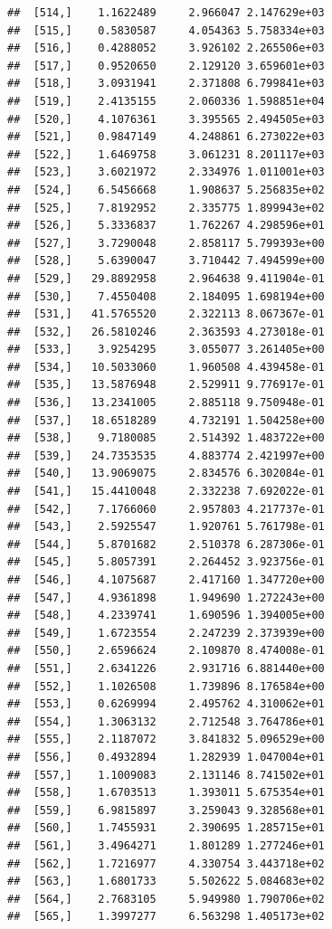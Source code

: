 \documentclass[article]{jss}\usepackage[]{graphicx}\usepackage[]{xcolor}
\makeatletter
\newenvironment{kframe}{%
 \def\at@end@of@kframe{}%
 \ifinner\ifhmode%
  \def\at@end@of@kframe{\end{minipage}}%
  \begin{minipage}{\columnwidth}%
 \fi\fi%
 \def\FrameCommand##1{\hskip\@totalleftmargin \hskip-\fboxsep
 \colorbox{shadecolor}{##1}\hskip-\fboxsep
     \hskip-\linewidth \hskip-\@totalleftmargin \hskip\columnwidth}%
 \MakeFramed {\advance\hsize-\width
   \@totalleftmargin\z@ \linewidth\hsize
   \@setminipage}}%
 {\par\unskip\endMakeFramed%
 \at@end@of@kframe}
\newenvironment{knitrout}{}{} %
\makeatother
\begin{document}
\begin{knitrout}
\begin{kframe}
\begin{verbatim}
##  [514,]    1.1622489     2.966047 2.147629e+03
##  [515,]    0.5830587     4.054363 5.758334e+03
##  [516,]    0.4288052     3.926102 2.265506e+03
##  [517,]    0.9520650     2.129120 3.659601e+03
##  [518,]    3.0931941     2.371808 6.799841e+03
##  [519,]    2.4135155     2.060336 1.598851e+04
##  [520,]    4.1076361     3.395565 2.494505e+03
##  [521,]    0.9847149     4.248861 6.273022e+03
##  [522,]    1.6469758     3.061231 8.201117e+03
##  [523,]    3.6021972     2.334976 1.011001e+03
##  [524,]    6.5456668     1.908637 5.256835e+02
##  [525,]    7.8192952     2.335775 1.899943e+02
##  [526,]    5.3336837     1.762267 4.298596e+01
##  [527,]    3.7290048     2.858117 5.799393e+00
##  [528,]    5.6390047     3.710442 7.494599e+00
##  [529,]   29.8892958     2.964638 9.411904e-01
##  [530,]    7.4550408     2.184095 1.698194e+00
##  [531,]   41.5765520     2.322113 8.067367e-01
##  [532,]   26.5810246     2.363593 4.273018e-01
##  [533,]    3.9254295     3.055077 3.261405e+00
##  [534,]   10.5033060     1.960508 4.439458e-01
##  [535,]   13.5876948     2.529911 9.776917e-01
##  [536,]   13.2341005     2.885118 9.750948e-01
##  [537,]   18.6518289     4.732191 1.504258e+00
##  [538,]    9.7180085     2.514392 1.483722e+00
##  [539,]   24.7353535     4.883774 2.421997e+00
##  [540,]   13.9069075     2.834576 6.302084e-01
##  [541,]   15.4410048     2.332238 7.692022e-01
##  [542,]    7.1766060     2.957803 4.217737e-01
##  [543,]    2.5925547     1.920761 5.761798e-01
##  [544,]    5.8701682     2.510378 6.287306e-01
##  [545,]    5.8057391     2.264452 3.923756e-01
##  [546,]    4.1075687     2.417160 1.347720e+00
##  [547,]    4.9361898     1.949690 1.272243e+00
##  [548,]    4.2339741     1.690596 1.394005e+00
##  [549,]    1.6723554     2.247239 2.373939e+00
##  [550,]    2.6596624     2.109870 8.474008e-01
##  [551,]    2.6341226     2.931716 6.881440e+00
##  [552,]    1.1026508     1.739896 8.176584e+00
##  [553,]    0.6269994     2.495762 4.310062e+01
##  [554,]    1.3063132     2.712548 3.764786e+01
##  [555,]    2.1187072     3.841832 5.096529e+00
##  [556,]    0.4932894     1.282939 1.047004e+01
##  [557,]    1.1009083     2.131146 8.741502e+01
##  [558,]    1.6703513     1.393011 5.675354e+01
##  [559,]    6.9815897     3.259043 9.328568e+01
##  [560,]    1.7455931     2.390695 1.285715e+01
##  [561,]    3.4964271     1.801289 1.277246e+01
##  [562,]    1.7216977     4.330754 3.443718e+02
##  [563,]    1.6801733     5.502622 5.084683e+02
##  [564,]    2.7683105     5.949980 1.790706e+02
##  [565,]    1.3997277     6.563298 1.405173e+02

\end{verbatim}
\end{kframe}
\end{knitrout}
\end{document}
